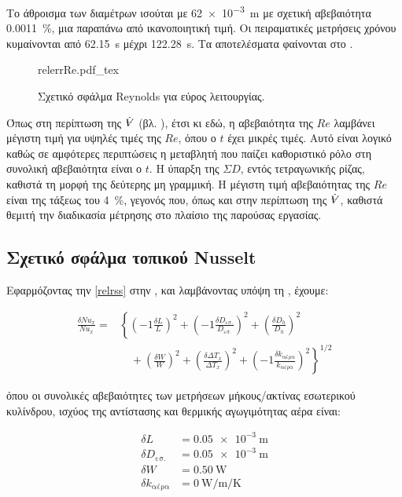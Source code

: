 Το άθροισμα των διαμέτρων ισούται με \qty{62e-3}{\metre} με σχετική αβεβαιότητα \qty{0.0011}{\percent}, μια παραπάνω από ικανοποιητική τιμή. Οι πειραματικές μετρήσεις χρόνου κυμαίνονται από \qty{62.15}{\second} μέχρι \qty{122.28}{\second}. Τα αποτελέσματα φαίνονται στο .

\begin{figure}[!htbp]
\centering
{relerrRe.pdf_tex}
\caption{Σχετικό σφάλμα Reynolds για εύρος λειτουργίας.}\label{plt:relreE}
\end{figure}

Όπως στη περίπτωση της $\dot{\volume}$ (βλ. ), έτσι κι εδώ, η αβεβαιότητα της $Re$ λαμβάνει μέγιστη τιμή για υψηλές τιμές της $Re$, όπου ο $t$ έχει μικρές τιμές. Αυτό είναι λογικό καθώς σε αμφότερες περιπτώσεις η μεταβλητή που παίζει καθοριστικό ρόλο στη συνολική αβεβαιότητα είναι ο $t$. Η ύπαρξη της $\Sigma D$, εντός τετραγωνικής ρίζας, καθιστά τη μορφή της δεύτερης μη γραμμική. Η μέγιστη τιμή αβεβαιότητας της $Re$ είναι της τάξεως του \qty{4}{\percent}, γεγονός που, όπως και στην περίπτωση της $\dot{\volume}$, καθιστά θεμιτή την διαδικασία μέτρησης στο πλαίσιο της παρούσας εργασίας.

\subsection{Σχετικό σφάλμα τοπικού Nusselt}\label{nusseltunc}

\noindent Εφαρμόζοντας την \ref{relrss} στην , και λαμβάνοντας υπόψη τη , έχουμε:


\begin{align*}
\frac{\delta Nu_x}{Nu_x} = &\left\{ \left(-1\frac{\delta L}{L}\right) ^ 2 + \left(-1\frac{\delta D_{\text{εσ.}}}{D_{\text{εσ.}}}\right) ^ 2 + \left(\frac{\delta D_h}{D_h}\right) ^ 2 \right.\\
 &\left. \quad + \left(\frac{\delta W}{W}\right) ^ 2 + \left(\frac{\delta \Delta T_x}{\Delta T_x}\right) ^ 2 + \left(-1\frac{\delta k_{\text{αέρα}}}{k_{\text{αέρα}}}\right) ^ 2 \right\} ^ {1/2}
\end{align*}

\noindent όπου οι συνολικές αβεβαιότητες των μετρήσεων μήκους/ακτίνας εσωτερικού κυλίνδρου, ισχύος της αντίστασης και θερμικής αγωγιμότητας αέρα είναι:

\begin{align*}
\delta L &= \qty{0.05e-3}{\metre}\\
\delta D_{\text{εσ.}} &= \qty{0.05e-3}{\metre}\\
\delta W &= \qty{0.50}{\watt}\\
\delta k_{\text{αέρα}} &= \qty{0}{\watt\per\metre\per\kelvin} 
\end{align*}

